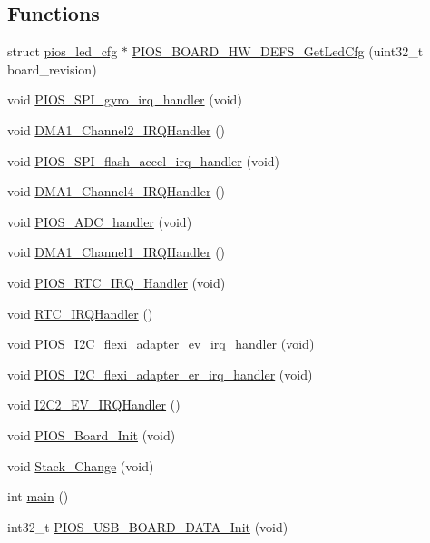 \subsection*{\-Functions}
\begin{DoxyCompactItemize}
\item 
struct \hyperlink{structpios__led__cfg}{pios\-\_\-led\-\_\-cfg} $\ast$ \hyperlink{group___copter_control_gafb76ae90816003eabf1d90feff7b1a52}{\-P\-I\-O\-S\-\_\-\-B\-O\-A\-R\-D\-\_\-\-H\-W\-\_\-\-D\-E\-F\-S\-\_\-\-Get\-Led\-Cfg} (uint32\-\_\-t board\-\_\-revision)
\item 
void \hyperlink{group___copter_control_ga6f05a1487b9b8de794d06f0e6241e983}{\-P\-I\-O\-S\-\_\-\-S\-P\-I\-\_\-gyro\-\_\-irq\-\_\-handler} (void)
\item 
void \hyperlink{group___copter_control_ga4055152a9bfe1072e00247cc351276ba}{\-D\-M\-A1\-\_\-\-Channel2\-\_\-\-I\-R\-Q\-Handler} ()
\item 
void \hyperlink{group___copter_control_ga6f6266c85c7c1d13a0945cde0127069e}{\-P\-I\-O\-S\-\_\-\-S\-P\-I\-\_\-flash\-\_\-accel\-\_\-irq\-\_\-handler} (void)
\item 
void \hyperlink{group___copter_control_ga9cdc63af1166aec768f87546a48bec8d}{\-D\-M\-A1\-\_\-\-Channel4\-\_\-\-I\-R\-Q\-Handler} ()
\item 
void \hyperlink{group___copter_control_gad6ef17a736d2c33cf82ce413c8a9b070}{\-P\-I\-O\-S\-\_\-\-A\-D\-C\-\_\-handler} (void)
\item 
void \hyperlink{group___copter_control_gabd49de55f82b1a0be3edaaf34dbe4b14}{\-D\-M\-A1\-\_\-\-Channel1\-\_\-\-I\-R\-Q\-Handler} ()
\item 
void \hyperlink{group___copter_control_gadc73bf2eccd9d9ff9d8efedd1e743704}{\-P\-I\-O\-S\-\_\-\-R\-T\-C\-\_\-\-I\-R\-Q\-\_\-\-Handler} (void)
\item 
void \hyperlink{group___copter_control_ga97e62d710cac4e413791be18ac03bc88}{\-R\-T\-C\-\_\-\-I\-R\-Q\-Handler} ()
\item 
void \hyperlink{group___copter_control_gaac69f41c2ed0aac05163c5fccc099e11}{\-P\-I\-O\-S\-\_\-\-I2\-C\-\_\-flexi\-\_\-adapter\-\_\-ev\-\_\-irq\-\_\-handler} (void)
\item 
void \hyperlink{group___copter_control_gaa40b70711de123cb5bfc1ba7f9441580}{\-P\-I\-O\-S\-\_\-\-I2\-C\-\_\-flexi\-\_\-adapter\-\_\-er\-\_\-irq\-\_\-handler} (void)
\item 
void \hyperlink{group___copter_control_gaa32a80208798d6132876a58823ff6202}{\-I2\-C2\-\_\-\-E\-V\-\_\-\-I\-R\-Q\-Handler} ()
\item 
void \hyperlink{group___copter_control_ga902009c5b1cb57d9f9d60092eb7cacfb}{\-P\-I\-O\-S\-\_\-\-Board\-\_\-\-Init} (void)
\item 
void \hyperlink{group___copter_control_ga7a789e7b91612099a4a1f355b9e97c24}{\-Stack\-\_\-\-Change} (void)
\item 
int \hyperlink{group___copter_control_gae66f6b31b5ad750f1fe042a706a4e3d4}{main} ()
\item 
int32\-\_\-t \hyperlink{group___copter_control_ga5efd94ab761f254827f38dba474cf642}{\-P\-I\-O\-S\-\_\-\-U\-S\-B\-\_\-\-B\-O\-A\-R\-D\-\_\-\-D\-A\-T\-A\-\_\-\-Init} (void)
\end{DoxyCompactItemize}

